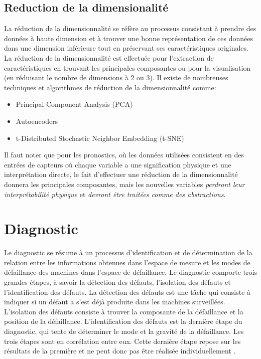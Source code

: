 \subsection{Reduction de la dimensionalité}
\label{section:dimensionality-reduction}
La réduction de la dimensionnalité se réfère au processus consistant à prendre des données à haute dimension et à trouver une bonne représentation de ces données dans une dimension inférieure tout en préservant ses caractéristiques originales. La réduction de la dimensionnalité est effectuée pour l'extraction de caractéristiques en trouvant les principales composantes ou pour la visualisation (en réduisant le nombre de dimensions à 2 ou 3).
Il existe de nombreuses techniques et algorithmes de réduction de la dimensionnalité comme:
\begin{itemize}
    \item Principal Component Analysis (PCA)
    \item Autoencoders
    \item t-Distributed Stochastic Neighbor Embedding (t-SNE)
\end{itemize}

Il faut noter que pour les pronostics, où les données utilisées consistent en des entrées de capteurs où chaque variable a une signification physique et une interprétation directe, le fait d'effectuer une réduction de la dimensionnalité donnera les principales composantes, mais les nouvelles variables \textit{perdront leur interprétabilité physique} et \textit{devront être traitées comme des abstractions}.

\section{Diagnostic}
Le diagnostic se résume à un processus d'identification et de détermination de la relation entre les informations obtenues dans l'espace de mesure et les modes de défaillance des machines dans l'espace de défaillance. Le diagnostic comporte trois grandes étapes, à savoir la détection des défauts, l'isolation des défauts et l'identification des défauts. La détection des défauts est une tâche qui consiste à indiquer si un défaut a s'est déjà produite dans les machines surveillées. L'isolation des défauts consiste à trouver la composante de la défaillance et la position de la défaillance. L'identification des défauts est la dernière étape du diagnostic, qui tente de déterminer le mode et la gravité de la défaillance. Les trois étapes sont en corrélation entre eux. Cette dernière étape repose sur les résultats de la première et ne peut donc pas être réalisée individuellement \cite{Lei2016b}.

